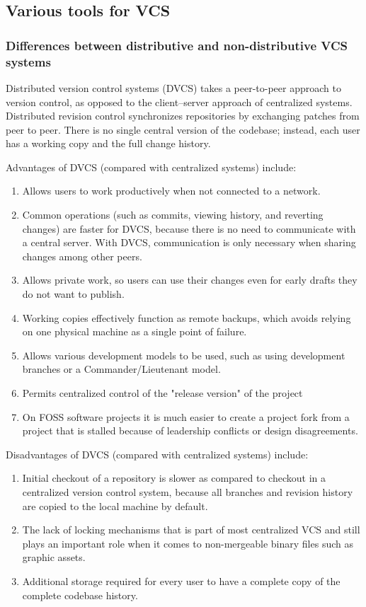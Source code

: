 \documentclass[a4paper]{report}
\begin{document}
\subsection{Various tools for VCS}
\subsubsection{Differences between distributive and non-distributive VCS systems}
\par
Distributed version control systems (DVCS) takes a peer-to-peer approach to version control, as opposed to the client–server approach of centralized systems. Distributed revision control synchronizes repositories by exchanging patches from peer to peer. There is no single central version of the codebase; instead, each user has a working copy and the full change history.
\par
Advantages of DVCS (compared with centralized systems) include:
\begin{enumerate}
  \item Allows users to work productively when not connected to a network.
  \item Common operations (such as commits, viewing history, and reverting changes) are faster for DVCS, because there is no need to communicate with a central server. With DVCS, communication is only necessary when sharing changes among other peers.
  \item Allows private work, so users can use their changes even for early drafts they do not want to publish.
  \item Working copies effectively function as remote backups, which avoids relying on one physical machine as a single point of failure.
  \item Allows various development models to be used, such as using development branches or a Commander/Lieutenant model.
  \item Permits centralized control of the "release version" of the project
  \item On FOSS software projects it is much easier to create a project fork from a project that is stalled because of leadership conflicts or design disagreements.
\end{enumerate}
\par
Disadvantages of DVCS (compared with centralized systems) include:
\begin{enumerate}
  \item Initial checkout of a repository is slower as compared to checkout in a centralized version control system, because all branches and revision history are copied to the local machine by default.
  \item The lack of locking mechanisms that is part of most centralized VCS and still plays an important role when it comes to non-mergeable binary files such as graphic assets.
  \item Additional storage required for every user to have a complete copy of the complete codebase history.
\end{enumerate}
\end{document}
